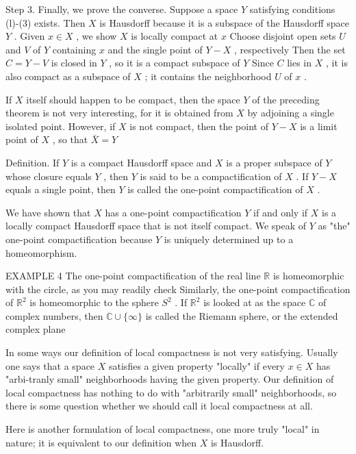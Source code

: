 \documentclass[10pt]{article}
\begin{document}
Step 3. Finally, we prove the converse. Suppose a space \(Y\) satisfying conditions (l)-(3) exists. Then \(X\) is Hausdorff because it is a subspace of the Hausdorff space \(Y\) . Given \(x \in  X\) , we show \(X\) is locally compact at \(x\) Choose disjoint open sets \(U\) and \(V\) of \(Y\) containing \(x\) and the single point of \(Y - X\) , respectively Then the set \(C = Y - V\) is closed in \(Y\) , so it is a compact subspace of \(Y\) Since \(C\) lies in \(X\) , it is also compact as a subspace of \(X\) ; it contains the neighborhood \(U\) of \(x\) .

If \(X\) itself should happen to be compact, then the space \(Y\) of the preceding theorem is not very interesting, for it is obtained from \(X\) by adjoining a single isolated point. However, if \(X\) is not compact, then the point of \(Y - X\) is a limit point of \(X\) , so that \(\bar{X} = Y\)

Definition. If \(Y\) is a compact Hausdorff space and \(X\) is a proper subspace of \(Y\) whose closure equals \(Y\) , then \(Y\) is said to be a compactification of \(X\) . If \(Y - X\) equals a single point, then \(Y\) is called the one-point compactification of \(X\) .

We have shown that \(X\) has a one-point compactification \(Y\) if and only if \(X\) is a locally compact Hausdorff space that is not itself compact. We speak of \(Y\) as "the" one-point compactification because \(Y\) is uniquely determined up to a homeomorphism.

EXAMPLE 4 The one-point compactification of the real line \(\mathbb{R}\) is homeomorphic with the circle, as you may readily check Similarly, the one-point compactification of \({\mathbb{R}}^{2}\) is homeomorphic to the sphere \({S}^{2}\) . If \({\mathbb{R}}^{2}\) is looked at as the space \(\mathbb{C}\) of complex numbers, then \(\mathbb{C} \cup  \{ \infty \}\) is called the Riemann sphere, or the extended complex plane

In some ways our definition of local compactness is not very satisfying. Usually one says that a space \(X\) satisfies a given property "locally" if every \(x \in  X\) has "arbi-tranly small" neighborhoods having the given property. Our definition of local compactness has nothing to do with "arbitrarily small" neighborhoods, so there is some question whether we should call it local compactness at all.

Here is another formulation of local compactness, one more truly "local" in nature; it is equivalent to our definition when \(X\) is Hausdorff.
\end{document}
